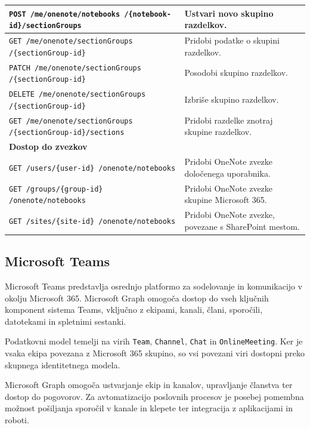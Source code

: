 \documentclass[a4paper, 12pt]{book}
\begin{document}
\begin{longtable}{|p{6cm}|p{8cm}|}
\texttt{POST /me/onenote/notebooks
/\{notebook-id\}/sectionGroups} &
Ustvari novo skupino razdelkov. \\
\hline

\texttt{GET /me/onenote/sectionGroups
/\{sectionGroup-id\}} &
Pridobi podatke o skupini razdelkov. \\
\hline

\texttt{PATCH /me/onenote/sectionGroups
/\{sectionGroup-id\}} &
Posodobi skupino razdelkov. \\
\hline

\texttt{DELETE /me/onenote/sectionGroups
/\{sectionGroup-id\}} &
Izbriše skupino razdelkov. \\
\hline

\texttt{GET /me/onenote/sectionGroups
/\{sectionGroup-id\}/sections} &
Pridobi razdelke znotraj skupine razdelkov. \\
\hline

\multicolumn{2}{|l|}{\textbf{Dostop do zvezkov}} \\
\hline

\texttt{GET /users/\{user-id\}
/onenote/notebooks} &
Pridobi OneNote zvezke določenega uporabnika. \\
\hline

\texttt{GET /groups/\{group-id\}
/onenote/notebooks} &
Pridobi OneNote zvezke skupine Microsoft 365. \\
\hline

\texttt{GET /sites/\{site-id\}
/onenote/notebooks} &
Pridobi OneNote zvezke, povezane s SharePoint mestom. \\
\hline

\end{longtable}

\subsection{Microsoft Teams}

Microsoft Teams predstavlja osrednjo platformo za sodelovanje in komunikacijo v okolju Microsoft 365. Microsoft Graph omogoča dostop do vseh ključnih komponent sistema Teams, vključno z ekipami, kanali, člani, sporočili, datotekami in spletnimi sestanki.

Podatkovni model temelji na virih \texttt{Team}, \texttt{Channel}, \texttt{Chat} in \texttt{OnlineMeeting}. Ker je vsaka ekipa povezana z Microsoft 365 skupino, so vsi povezani viri dostopni preko skupnega identitetnega modela.

Microsoft Graph omogoča ustvarjanje ekip in kanalov, upravljanje članstva ter dostop do pogovorov. Za avtomatizacijo poslovnih procesov je posebej pomembna možnost pošiljanja sporočil v kanale in klepete ter integracija z aplikacijami in roboti.
\end{document}

